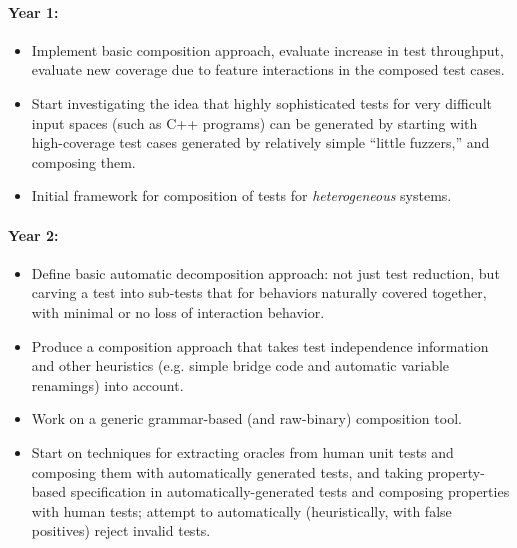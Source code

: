 \paragraph{Year 1:}
\begin{itemize}
\item
Implement basic composition approach, evaluate increase
in test throughput, evaluate new coverage due to feature interactions
in the composed test cases.
\item
Start investigating the idea that highly sophisticated tests for very
difficult input spaces (such as C++ programs) can be generated
by starting with high-coverage test cases generated by relatively simple
``little fuzzers,'' and composing them.
\item Initial framework for composition of tests for
  \emph{heterogeneous} systems.
\end{itemize}

\paragraph{Year 2:}
\begin{itemize}
\item
Define basic automatic decomposition approach: not just test reduction, but carving a test into sub-tests that for behaviors
naturally covered together, with minimal or no loss of interaction
behavior.
\item
Produce a composition approach that takes test independence
information and other heuristics (e.g. simple bridge code and
automatic variable
renamings) into account.
\item
Work on a generic grammar-based (and raw-binary) composition tool.
\item
Start on techniques for extracting
oracles from human unit tests and composing them with automatically
generated tests, and taking property-based specification
\cite{ClaessenH00,hypothesis} in automatically-generated tests and
composing properties with human tests; attempt to automatically
(heuristically, with false positives) reject invalid tests.
\end{itemize}

